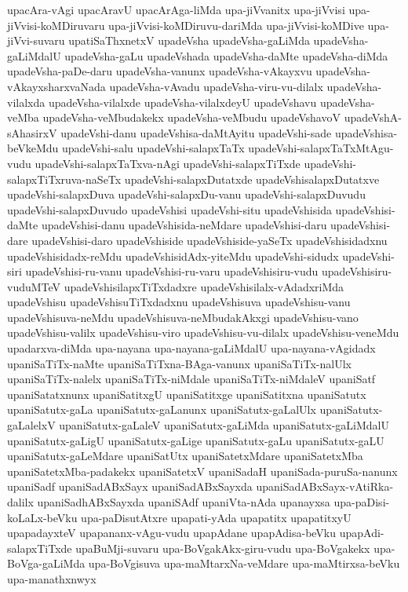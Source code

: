 {upacAra-vAgi
upacAravU
upacArAga-liMda
upa-jiVvanitx
upa-jiVvisi
upa-jiVvisi-koMDiruvaru
upa-jiVvisi-koMDiruvu-dariMda
upa-jiVvisi-koMDive
upa-jiVvi-suvaru
upatiSaThxnetxV
upadeVsha
upadeVsha-gaLiMda
upadeVsha-gaLiMdalU
upadeVsha-gaLu
upadeVshada
upadeVsha-daMte
upadeVsha-diMda
upadeVsha-paDe-daru
upadeVsha-vanunx
upadeVsha-vAkayxvu
upadeVsha-vAkayxsharxvaNada
upadeVsha-vAvadu
upadeVsha-viru-vu-dilalx
upadeVsha-vilalxda
upadeVsha-vilalxde
upadeVsha-vilalxdeyU
upadeVshavu
upadeVsha-veMba
upadeVsha-veMbudakekx
upadeVsha-veMbudu
upadeVshavoV
upadeVshA-sAhasirxV
upadeVshi-danu
upadeVshisa-daMtAyitu
upadeVshi-sade
upadeVshisa-beVkeMdu
upadeVshi-salu
upadeVshi-salapxTaTx
upadeVshi-salapxTaTxMtAgu-vudu
upadeVshi-salapxTaTxva-nAgi
upadeVshi-salapxTiTxde
upadeVshi-salapxTiTxruva-naSeTx
upadeVshi-salapxDutatxde
upadeVshisalapxDutatxve
upadeVshi-salapxDuva
upadeVshi-salapxDu-vanu
upadeVshi-salapxDuvudu
upadeVshi-salapxDuvudo
upadeVshisi
upadeVshi-situ
upadeVshisida
upadeVshisi-daMte
upadeVshisi-danu
upadeVshisida-neMdare
upadeVshisi-daru
upadeVshisi-dare
upadeVshisi-daro
upadeVshiside
upadeVshiside-yaSeTx
upadeVshisidadxnu
upadeVshisidadx-reMdu
upadeVshisidAdx-yiteMdu
upadeVshi-sidudx
upadeVshi-siri
upadeVshisi-ru-vanu
upadeVshisi-ru-varu
upadeVshisiru-vudu
upadeVshisiru-vuduMTeV
upadeVshisilapxTiTxdadxre
upadeVshisilalx-vAdadxriMda
upadeVshisu
upadeVshisuTiTxdadxnu
upadeVshisuva
upadeVshisu-vanu
upadeVshisuva-neMdu
upadeVshisuva-neMbudakAkxgi
upadeVshisu-vano
upadeVshisu-valilx
upadeVshisu-viro
upadeVshisu-vu-dilalx
upadeVshisu-veneMdu
upadarxva-diMda
upa-nayana
upa-nayana-gaLiMdalU
upa-nayana-vAgidadx
upaniSaTiTx-naMte
upaniSaTiTxna-BAga-vanunx
upaniSaTiTx-nalUlx
upaniSaTiTx-nalelx
upaniSaTiTx-niMdale
upaniSaTiTx-niMdaleV
upaniSatf
upaniSatatxnunx
upaniSatitxgU
upaniSatitxge
upaniSatitxna
upaniSatutx
upaniSatutx-gaLa
upaniSatutx-gaLanunx
upaniSatutx-gaLalUlx
upaniSatutx-gaLalelxV
upaniSatutx-gaLaleV
upaniSatutx-gaLiMda
upaniSatutx-gaLiMdalU
upaniSatutx-gaLigU
upaniSatutx-gaLige
upaniSatutx-gaLu
upaniSatutx-gaLU
upaniSatutx-gaLeMdare
upaniSatUtx
upaniSatetxMdare
upaniSatetxMba
upaniSatetxMba-padakekx
upaniSatetxV
upaniSadaH
upaniSada-puruSa-nanunx
upaniSadf
upaniSadABxSayx
upaniSadABxSayxda
upaniSadABxSayx-vAtiRka-dalilx
upaniSadhABxSayxda
upaniSAdf
upaniVta-nAda
upanayxsa
upa-paDisi-koLaLx-beVku
upa-paDisutAtxre
upapati-yAda
upapatitx
upapatitxyU
upapadayxteV
upapananx-vAgu-vudu
upapAdane
upapAdisa-beVku
upapAdi-salapxTiTxde
upaBuMji-suvaru
upa-BoVgakAkx-giru-vudu
upa-BoVgakekx
upa-BoVga-gaLiMda
upa-BoVgisuva
upa-maMtarxNa-veMdare
upa-maMtirxsa-beVku
upa-manathxnwyx
}
